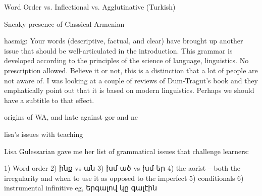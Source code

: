 Word Order vs. Inflectional vs. Agglutinative (Turkish)

Sneaky presence of Classical Armenian

hasmig: Your words (descriptive, factual, and clear) have brought up another issue that should be well-articulated in the introduction. This grammar is developed according to the principles of the science of language, linguistics. No prescription allowed. Believe it or not, this is a distinction that a lot of people are not aware of. I was looking at a couple of reviews of Dum-Tragut's book and they emphatically point out that it is based on modern linguistics. Perhaps we should have a subtitle to that effect.


origins of WA, and hate against gor and ne 

lisa's issues with teaching


Lisa Gulessarian gave me her list of grammatical issues that challenge learners:

1)  Word order
2)  ինք vs ան
3)  խմ-ած vs խմ-եր 
4) the aorist -- both the irregularity and when to use it as opposed to the imperfect
5) conditionals
6) instrumental infinitive eg, երգալով կը գալէին
